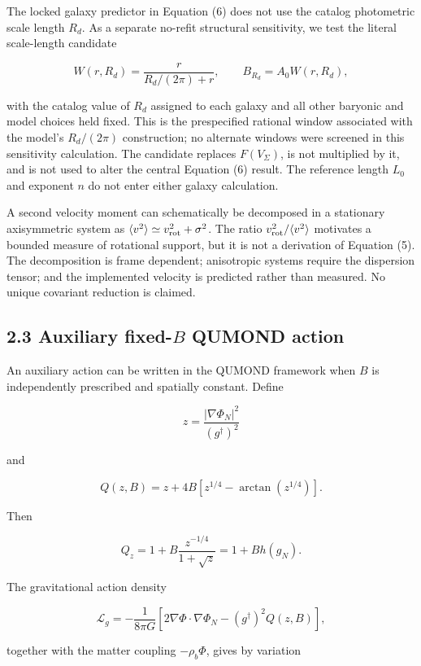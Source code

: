 \documentclass[utf8]{FrontiersinHarvard}
\begin{document}
The locked galaxy predictor in Equation (6) does not use the catalog photometric scale length \(R_d\). As a separate no-refit structural sensitivity, we test the literal scale-length candidate

\[
W(r,R_d)=\frac{r}{R_d/(2\pi)+r},
\qquad B_{R_d}=A_0W(r,R_d),
\]

with the catalog value of \(R_d\) assigned to each galaxy and all other baryonic and model choices held fixed. This is the prespecified rational window associated with the model's \(R_d/(2\pi)\) construction; no alternate windows were screened in this sensitivity calculation. The candidate replaces \(F(V_\Sigma)\), is not multiplied by it, and is not used to alter the central Equation (6) result. The reference length \(L_0\) and exponent \(n\) do not enter either galaxy calculation.

A second velocity moment can schematically be decomposed in a stationary axisymmetric system as \(\langle v^2\rangle\simeq v_{\rm rot}^2+\sigma^2\). The ratio \(v_{\rm rot}^2/\langle v^2\rangle\) motivates a bounded measure of rotational support, but it is not a derivation of Equation (5). The decomposition is frame dependent; anisotropic systems require the dispersion tensor; and the implemented velocity is predicted rather than measured. No unique covariant reduction is claimed.

\subsection{\texorpdfstring{2.3 Auxiliary fixed-\(B\) QUMOND action}{2.3 Auxiliary fixed-B QUMOND action}}\label{auxiliary-fixed-b-qumond-action}

An auxiliary action can be written in the QUMOND framework \citep{milgrom2010} when \(B\) is independently prescribed and spatially constant. Define

\[
z=\frac{|\nabla\Phi_N|^2}{(g^\dagger)^2}
\tag{7}
\]

and

\[
Q(z,B)=z+4B\left[z^{1/4}-\arctan\!\left(z^{1/4}\right)\right].
\tag{8}
\]

Then

\[
Q_z=1+B\frac{z^{-1/4}}{1+\sqrt z}
=1+B h(g_N).
\tag{9}
\]

The gravitational action density

\[
\mathcal L_g=-\frac{1}{8\pi G}
\left[2\nabla\Phi\cdot\nabla\Phi_N-(g^\dagger)^2Q(z,B)\right],
\tag{10}
\]

together with the matter coupling \(-\rho_b\Phi\), gives by variation
\end{document}
